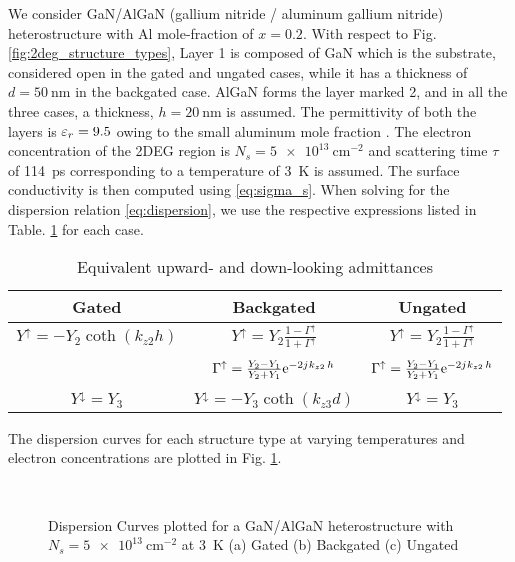 \documentclass[12pt]{article}
\begin{document}
We consider GaN/AlGaN (gallium nitride / aluminum gallium nitride)  heterostructure with Al mole-fraction of $x = \num[round-precision=1]{0.2}$. With respect to Fig. \ref{fig:2deg_structure_types}, Layer 1 is composed of GaN which is the substrate, considered open in the gated and ungated cases, while it has a thickness of $d = \SI{50}{\nm}$ in the backgated case. AlGaN forms the layer marked 2, and in all the three cases, a thickness, $h = \SI{20}{\nm}$ is assumed. The permittivity of both the layers is $\varepsilon_r = 9.5$ owing to the small aluminum mole fraction \cite{Muravjov2010}. The electron concentration of the 2DEG region is $N_s = \SI{5e13}{\cm^{-2}}$ and scattering time $\tau$ of \SI{114}{\ps} corresponding to a temperature of \SI{3}{\kelvin} is assumed. The surface conductivity is then computed using \eqref{eq:sigma_s}. When solving for the dispersion relation \eqref{eq:dispersion}, we use the respective expressions listed in Table. \ref{tab:equations} for each case.
%
\begin{table}[!htbp]
\begin{center}
 \begin{tabular}{||c |c |c||}
 \hline
 Gated & Backgated  & Ungated \\ [0.5ex]
 \hline\hline
 $Y^{\uparrow} = - Y_{2} \coth (k_{z2} h)$ & $Y^{\uparrow} = Y_{2} \frac{1 - \Gamma^{\uparrow}}{1 + \Gamma^{\uparrow}}$ & $Y^{\uparrow} = Y_{2} \frac{1 - \Gamma^{\uparrow}}{1 + \Gamma^{\uparrow}}$ \\  & & \\ [2ex]
\num{} & $\Gamma^{\uparrow} = \frac{Y_2 - Y_1}{Y_2 + Y_1} \mathrm{e}^{-2j\mkern1mu k_{z2}\, h}$ & $\Gamma^{\uparrow} = \frac{Y_2 - Y_1}{Y_2 + Y_1} \mathrm{e}^{-2j\mkern1mu k_{z2}\, h}$ \\  & &  \\ [2ex]
 $Y^{\downarrow} = Y_{3}$ & $Y^{\downarrow} = - Y_{3} \coth (k_{z3} d)$ &  $Y^{\downarrow} = Y_{3}$ \\
 \hline
 \end{tabular}
  \end{center}
 \caption{Equivalent upward- and down-looking admittances}
 \label{tab:equations}
\end{table}
%

The dispersion curves for each structure type at varying temperatures and electron concentrations are plotted in Fig. \ref{fig:dispersion_hif_lowT}.
%
\begin{figure}[!htbp]
  \centering
   \\
  \caption{Dispersion Curves plotted for a GaN/AlGaN heterostructure with $N_s = \SI{5e13}{\cm^{-2}}$ at \SI{3}{\kelvin} (a) Gated (b) Backgated (c) Ungated}
  \label{fig:dispersion_hif_lowT}
\end{figure}
%
\end{document}
